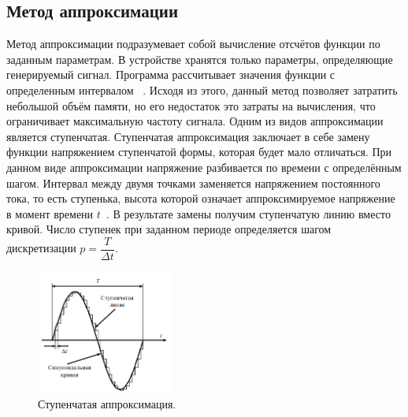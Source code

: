 \subsection{Метод аппроксимации}	
	Метод аппроксимации подразумевает собой вычисление отсчётов функции по заданным параметрам. В устройстве хранятся только параметры, определяющие генерируемый сигнал. Программа рассчитывает значения функции с определенным интервалом ~\cite{leso}. Исходя из этого, данный метод позволяет затратить небольшой объём памяти, но его недостаток это затраты на вычисления, что ограничивает максимальную частоту сигнала. 
	Одним из видов аппроксимации является ступенчатая. Ступенчатая аппроксимация заключает в себе замену функции напряжением ступенчатой формы, которая будет мало отличаться. 
   При данном виде аппроксимации напряжение разбивается по времени с определённым шагом. Интервал между двумя точками заменяется напряжением постоянного тока, то есть ступенька, высота которой означает аппроксимируемое напряжение в момент времени $t$~\cite{metr}.
   В результате замены получим ступенчатую линию вместо кривой. Число ступенек при заданном периоде определяется шагом дискретизации $p=\dfrac{T}{\Delta t}$.
	
	\begin{figure}[H]
    \centering
    \includegraphics[width=0.4\textwidth]{../image/apr.png}
    \caption{Ступенчатая аппроксимация.}
	\end{figure}
	
